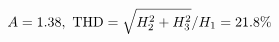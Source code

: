 \documentclass[preview]{standalone}
\begin{document}
\begin{align*}
\special{dvisvgm:raw <g id='unique000'>}A=1.38,\ \text{THD}=\sqrt{H_2^2+H_3^2}/H_1=21.8\%\special{dvisvgm:raw </g>}
\end{align*}
\end{document}

